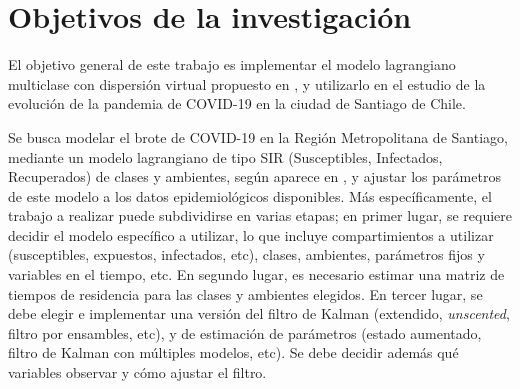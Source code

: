 \section{Objetivos de la investigación}



El objetivo general de este trabajo es implementar el modelo lagrangiano multiclase con dispersión virtual propuesto en \cite{Bichara2015}, y utilizarlo en el estudio de la evolución de la pandemia de COVID-19 en la ciudad de Santiago de Chile. 


Se busca modelar el brote de COVID-19 en la Región Metropolitana de Santiago, mediante un modelo lagrangiano de tipo SIR (Susceptibles, Infectados, Recuperados) de clases y ambientes, según aparece en \cite{Bichara2015}, y ajustar los parámetros de este modelo a los datos epidemiológicos disponibles.
Más específicamente, el trabajo a realizar puede subdividirse en varias etapas; en primer lugar, se requiere decidir el modelo específico a utilizar, lo que incluye compartimientos a utilizar (susceptibles, expuestos, infectados, etc), clases, ambientes, parámetros fijos y variables en el tiempo, etc. En segundo lugar, es necesario estimar una matriz de tiempos de residencia para las clases y ambientes elegidos. En tercer lugar, se debe elegir e implementar una versión del filtro de Kalman (extendido, \textit{unscented}, filtro por ensambles, etc), y de estimación de parámetros (estado aumentado, filtro de Kalman con múltiples modelos, etc). Se debe decidir además qué variables observar y cómo ajustar el filtro.

